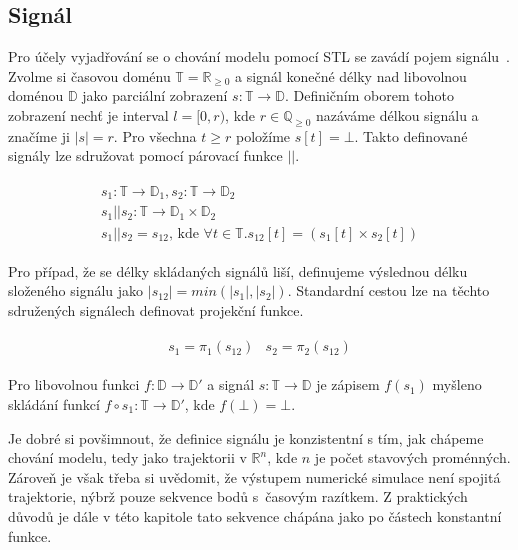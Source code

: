 \subsection{Signál}
Pro účely vyjadřování se o chování modelu pomocí STL se zavádí pojem signálu~\cite{maler2004}.
Zvolme si časovou doménu $\mathbb{T} = \mathbb{R}_{\geq 0}$ a signál konečné délky
nad libovolnou doménou $\mathbb{D}$ jako parciální zobrazení $s: \mathbb{T} \rightarrow \mathbb{D}$.
Definičním oborem tohoto zobrazení nechť je interval $l = [0, r)$, kde $r \in \mathbb{Q}_{\geq0}$ nazáváme
délkou signálu a značíme ji $|s| = r$. Pro všechna $t \geq r$ položíme $s[t] = \bot$. Takto definované
signály lze sdružovat pomocí párovací funkce $||$.

\begin{align}\label{eq:signals:pairing}
\begin{array}{ll}
s_1: \mathbb{T} \rightarrow \mathbb{D}_1, s_2: \mathbb{T} \rightarrow \mathbb{D}_2	\\
s_1 || s_2: \mathbb{T} \rightarrow \mathbb{D}_1 \times\mathbb{D}_2		\\
s_1 || s_2= s_{12}\textrm{, kde }\forall t\in\mathbb{T}. s_{12}[t] = (s_1[t] \times s_2[t])
\end{array}
\end{align}

Pro případ, že se délky skládaných signálů liší, definujeme výslednou délku složeného
signálu jako $|s_{12}| = min(|s_1|, |s_2|)$. Standardní cestou lze na těchto sdružených
signálech definovat projekční funkce.

\begin{align}\label{eq:signals:pairing}
\begin{array}{ll}
s_1 = \pi_1(s_{12})		& s_2 = \pi_2(s_{12})
\end{array}
\end{align}

Pro libovolnou funkci $f: \mathbb{D} \rightarrow \mathbb{D}'$ a signál $s: \mathbb{T} \rightarrow \mathbb{D}$ je zápisem $f(s_1)$ myšleno
skládání funkcí $f \circ s_1 : \mathbb{T} \rightarrow \mathbb{D}'$, kde $f(\bot) = \bot$.

Je dobré si povšimnout, že definice signálu je konzistentní s tím, jak chápeme chování modelu,
tedy jako trajektorii v $\mathbb{R}^n$, kde $n$ je počet sta\-vo\-vých proménných. Zároveň
je však třeba si uvědomit, že výstupem numerické simulace není spojitá trajektorie, nýbrž pouze
sekvence bodů s~ča\-so\-vým razítkem. Z praktických důvodů je dále v této kapitole tato sekvence
chá\-pá\-na jako po částech konstantní funkce.

